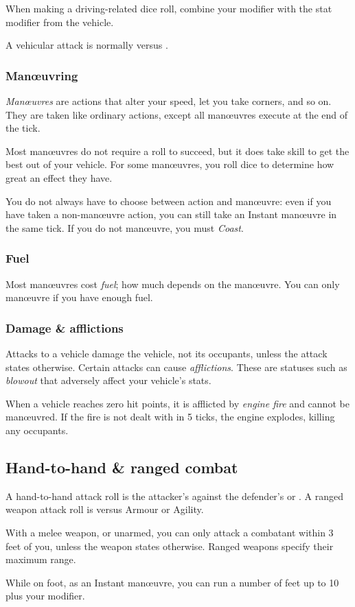 \documentclass[10pt, a4paper, twocolumn]{article}
\begin{document}
When making a driving-related dice roll, combine your 
modifier with the stat modifier from the vehicle.

A vehicular attack is normally  versus .

\subsubsection{Man\oe{}uvring}
\emph{Man\oe{}uvres} are actions that alter your speed, let you take corners,
and so on. They are taken like ordinary actions, except all man\oe{}uvres
execute at the end of the tick.

Most man\oe{}uvres do not require a roll to succeed, but it does take skill to
get the best out of your vehicle. For some man\oe{}uvres, you roll dice to
determine how great an effect they have.

You do not always have to choose between action and man\oe{}uvre: even if you
have taken a non-man\oe{}uvre action, you can still take an Instant man\oe{}uvre
in the same tick. If you do not man\oe{}uvre, you must \emph{Coast}.

\subsubsection{Fuel}
Most man\oe{}uvres cost \emph{fuel}; how much depends on the man\oe{}uvre. You
can only man\oe{}uvre if you have enough fuel.

\subsubsection{Damage \& afflictions}
Attacks to a vehicle damage the vehicle, not its occupants, unless the attack
states otherwise. Certain attacks can cause \emph{afflictions}. These are
statuses such as \emph{blowout} that adversely affect your vehicle's stats.

When a vehicle reaches zero hit points, it is afflicted by \emph{engine fire}
and cannot be man\oe{}uvred. If the fire is not dealt with in 5 ticks, the
engine explodes, killing any occupants.

\subsection{Hand-to-hand \& ranged combat}
A hand-to-hand attack roll is the attacker's  against the defender's  or . A ranged weapon attack roll is 
versus Armour or Agility. 

With a melee weapon, or unarmed, you can only attack a combatant within 3 feet
of you, unless the weapon states otherwise. Ranged weapons specify their maximum
range. 

While on foot, as an Instant man\oe{}uvre, you can run a number of feet up to 10
plus your  modifier.
\end{document}
